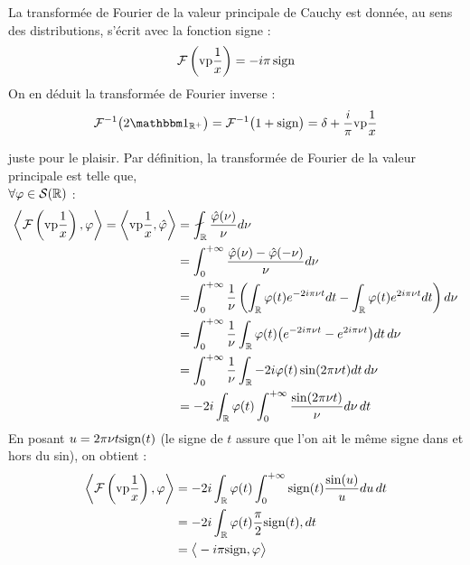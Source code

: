 \begin{propriete}\label{prop:fou2vp}
	La transformée de Fourier de la valeur principale de Cauchy est donnée, au sens des distributions, s'écrit avec la fonction signe :
	\begin{equation}
		\mathcal{F} \left(\text{vp} \frac{1}{x} \right)= -i \pi\, \text{sign}{} 
	\end{equation}
	On en déduit la transformée de Fourier inverse :
	\begin{equation}
	\mathcal{F}^{-1}\big( 2\one_{\R^+} \big) = \mathcal{F}^{-1}\big( 1 + \sign \big) = \delta + \frac{i}{\pi} \text{vp}\frac{1}{x}
	\end{equation}
	
	\begin{demo}
		juste pour le plaisir. Par définition, la transformée de Fourier de la valeur principale est telle que,\\ $\forall \varphi\in\mathcal{S}(\mathbb{R})$ :
		\begin{align*}
		\left\langle \mathcal{F} \left(\text{vp} \frac{1}{x} \right), \varphi \right\rangle = \left\langle \text{vp} \frac{1}{x}, \hat{\varphi} \right\rangle 
		&= \fint_\R \frac{\hat{\varphi}(\nu)}{\nu} d\nu \\
			&= \int_0^{+\infty} \frac{\hat{\varphi}(\nu) - \hat{\varphi}(-\nu)}{\nu} d\nu \\
			&= \int_0^{+\infty} \frac{1}{\nu} \left( \int_\R\varphi(t)e^{-2i\pi \nu t}dt - \int_\R\varphi(t)e^{2i\pi \nu t}dt \right)d\nu \\
			&= \int_0^{+\infty} \frac{1}{\nu}\int_\R\varphi(t)\big(e^{-2i\pi \nu t} - e^{2i\pi \nu t}\big)dt\, d\nu \\
			&= \int_0^{+\infty} \frac{1}{\nu}\int_\R-2i\varphi(t)\sin(2\pi \nu t)dt\, d\nu \\
			&= -2i\int_\R\varphi(t)\int_0^{+\infty} \frac{\sin(2\pi \nu t)}{\nu}d\nu\, dt
		\end{align*}
		En posant $u=2\pi\nu t\text{sign}(t)$ (le signe de $t$ assure que l'on ait le même signe dans et hors du sin), on obtient :
		\begin{align*}
		\left\langle \mathcal{F} \left(\text{vp} \frac{1}{x} \right), \varphi \right\rangle &= -2i\int_{\mathbb{R}}\varphi(t)\int_0^{+\infty} \text{sign}(t)\frac{\sin(u)}{u}du\, dt \\
		&= -2i\int_{\mathbb{R}}\varphi(t)\frac{\pi}{2}\text{sign}(t), dt \\
		&= \big\langle -i\pi\text{sign}, \varphi \big\rangle
		\end{align*}
	\end{demo}
\end{propriete}

